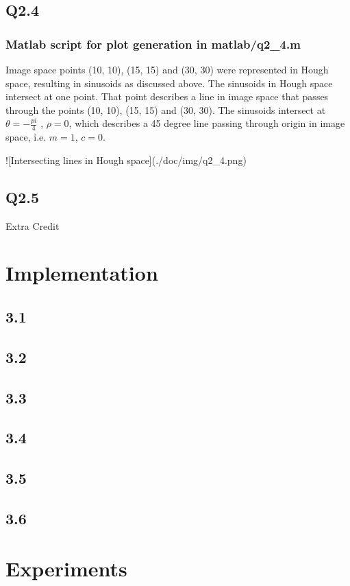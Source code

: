 \documentclass[12pt]{article}
\begin{document}
\subsection{Q2.4  }
\subsubsection{ Matlab script for plot generation in matlab/q2_4.m}
Image space points (10, 10), (15, 15) and (30, 30) were represented in Hough space, resulting in sinusoids as discussed above. The sinusoids in Hough space intersect at one point. That point describes a line in image space that passes through the points (10, 10), (15, 15) and (30, 30). The sinusoids intersect at $\theta = - \frac{pi}{4}$ , $\rho = 0$, which describes a 45 degree line passing through origin in image space, i.e. $m=1$, $c=0$.

![Intersecting lines in Hough space](./doc/img/q2_4.png)  


\subsection{Q2.5  }
Extra Credit

\section{Implementation}

\subsection{3.1}
\subsection{3.2}
\subsection{3.3}
\subsection{3.4}
\subsection{3.5}
\subsection{3.6}

\section{Experiments}
\end{document}

